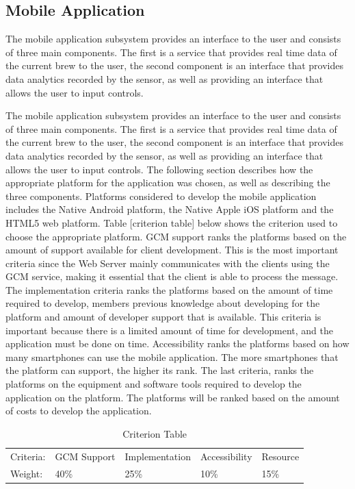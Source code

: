 \documentclass{article}
\begin{document}
\subsection{Mobile Application}\label{subsec:mobile-app}
The mobile application subsystem provides an interface to the user and consists of three main components. The first is a service that provides real time data of the current brew to the user, the second component is an interface that provides data analytics recorded by the sensor, as well as providing an interface that allows the user to input controls.


The mobile application subsystem provides an interface to the user and consists of three main components. The first is a service that provides real time data of the current brew to the user, the second component is an interface that provides data analytics recorded by the sensor, as well as providing an interface that allows the user to input controls. The following section describes how the appropriate platform for the application was chosen, as well as describing the three components.
Platforms considered to develop the mobile application includes the Native Android platform, the Native Apple iOS platform and the HTML5 web platform. Table [criterion table] below shows the criterion used to choose the appropriate platform. GCM support ranks the platforms based on the amount of support available for client development. This is the most important criteria since the Web Server mainly communicates with the clients using the GCM service, making it essential that the client is able to process the message. The implementation criteria ranks the platforms based on the amount of time required to develop, members previous knowledge about developing for the platform and amount of developer support that is available. This criteria is important because there is a limited amount of time for development, and the application must be done on time. Accessibility ranks the platforms based on how many smartphones can use the mobile application. The more smartphones that the platform can support, the higher its rank. The last criteria, ranks the platforms on the equipment and software tools required to develop the application on the platform. The platforms will be ranked based on the amount of costs to develop the application.

\begin{table}[H]
\centering
\caption{Criterion Table}
\label{fig:criterion-table}
\begin{tabular}{lllll}
Criteria: & GCM Support & Implementation & Accessibility & Resource \\
Weight:   & 40\%        & 25\%           & 10\%          & 15\%    
\end{tabular}
\end{table}
\end{document}
